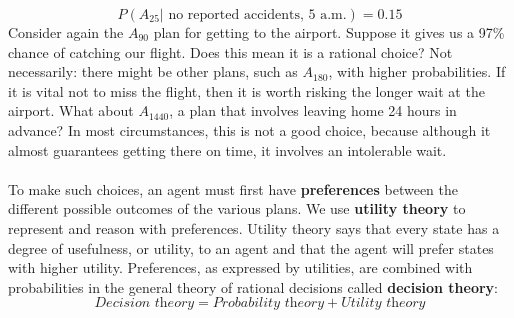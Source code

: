 \[P(A_{25}|\,\, \text{no reported accidents, 5 a.m.}) = 0.15\]
Consider again the $A_{90}$ plan for getting to the airport. Suppose it gives us a 97\% chance of catching our flight. Does this mean it is a rational choice? Not necessarily: there might be other plans, such as $A_{180}$, with higher probabilities.  If it is vital not to miss the flight, then it is worth risking the longer wait at the airport. What about $A_{1440}$, a plan that involves
leaving home 24 hours in advance? In most circumstances, this is not a good choice, because although it almost guarantees getting there on time, it involves an intolerable wait.\\\\
To make such choices, an agent must first have \textbf{preferences} between the different possible outcomes of the various plans. We use \textbf{utility theory} to represent and reason with preferences.  Utility theory says that every state has a degree of usefulness, or utility, to an agent and that the agent will prefer states with higher utility. Preferences, as expressed by utilities, are combined with probabilities in the general theory of rational decisions called \textbf{decision theory}:
\[\textit{Decision theory} = \textit{Probability theory} + \textit{Utility theory}\]

